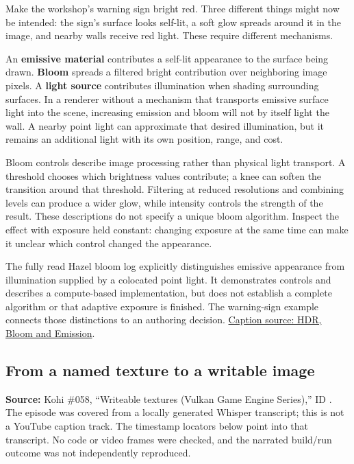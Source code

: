 \hypertarget{06-engine-ii-ch026-separate-a-glowing-image-from-illumination-of-the-room}{}

Make the workshop's warning sign bright red. Three different things might now be intended: the sign's surface looks self-lit, a soft glow spreads around it in the image, and nearby walls receive red light. These require different mechanisms.

An \textbf{emissive material} contributes a self-lit appearance to the surface being drawn. \textbf{Bloom} spreads a filtered bright contribution over neighboring image pixels. A \textbf{light source} contributes illumination when shading surrounding surfaces. In a renderer without a mechanism that transports emissive surface light into the scene, increasing emission and bloom will not by itself light the wall. A nearby point light can approximate that desired illumination, but it remains an additional light with its own position, range, and cost.

Bloom controls describe image processing rather than physical light transport. A threshold chooses which brightness values contribute; a knee can soften the transition around that threshold. Filtering at reduced resolutions and combining levels can produce a wider glow, while intensity controls the strength of the result. These descriptions do not specify a unique bloom algorithm. Inspect the effect with exposure held constant: changing exposure at the same time can make it unclear which control changed the appearance.

The fully read Hazel bloom log explicitly distinguishes emissive appearance from illumination supplied by a colocated point light. It demonstrates controls and describes a compute-based implementation, but does not establish a complete algorithm or that adaptive exposure is finished. The warning-sign example connects those distinctions to an authoring decision. \href{https://www.youtube.com/watch?v=ThA9pueKvus}{Caption source: HDR, Bloom and Emission}.

\subsection{From a named texture to a writable image}\label{06-engine-ii-ch026-from-a-named-texture-to-a-writable-image}

\hypertarget{06-engine-ii-ch026-from-a-named-texture-to-a-writable-image}{}

\textbf{Source:} Kohi \#058, ``Writeable textures (Vulkan Game Engine Series),'' ID . The episode was covered from a locally generated Whisper transcript; this is not a YouTube caption track. The timestamp locators below point into that transcript. No code or video frames were checked, and the narrated build/run outcome was not independently reproduced.

